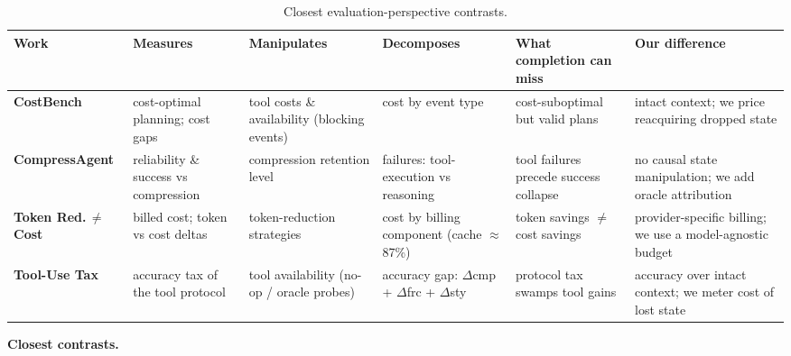\documentclass[11pt]{article}
\begin{document}
\begin{table}[t]
\centering
\small
\caption{Closest evaluation-perspective contrasts.}
\label{tab:contrasts}
\begin{tabular}{@{}>{\raggedright\arraybackslash}p{2.0cm}>{\raggedright\arraybackslash}p{1.9cm}>{\raggedright\arraybackslash}p{1.9cm}>{\raggedright\arraybackslash}p{1.9cm}>{\raggedright\arraybackslash}p{2.1cm}>{\raggedright\arraybackslash}p{2.1cm}@{}}
\toprule
\textbf{Work} & \textbf{Measures} & \textbf{Manipulates} & \textbf{Decomposes} & \textbf{What completion can miss} & \textbf{Our difference} \\
\midrule
\textbf{CostBench} & cost-optimal planning; cost gaps & tool costs \& availability (blocking events) & cost by event type & cost-suboptimal but valid plans & intact context; we price reacquiring dropped state \\
\textbf{Compress\-Agent} & reliability \& success vs compression & compression retention level & failures: tool-execution vs reasoning & tool failures precede success collapse & no causal state manipulation; we add oracle attribution \\
\textbf{Token Red.\,$\neq$\,Cost} & billed cost; token vs cost deltas & token-reduction strategies & cost by billing component (cache $\approx$87\%) & token savings $\neq$ cost savings & provider-specific billing; we use a model-agnostic budget \\
\textbf{Tool-Use Tax} & accuracy tax of the tool protocol & tool availability (no-op / oracle probes) & accuracy gap: $\Delta$cmp + $\Delta$frc + $\Delta$sty & protocol tax swamps tool gains & accuracy over intact context; we meter cost of lost state \\
\bottomrule
\end{tabular}
\end{table}

\textbf{Closest contrasts.}
\end{document}
